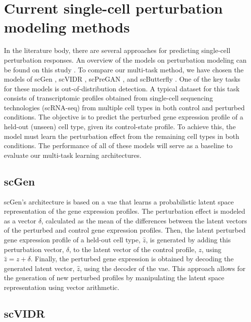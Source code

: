 \documentclass[12pt, a4paper]{article}
\begin{document}
\section{Current single-cell perturbation modeling methods}

In the literature body, there are several approaches for predicting single-cell perturbation responses. An overview of the models on perturbation modeling can be found on this study \cite{gavriilidisMinireviewPerturbationModelling2024}. To compare our multi-task method, we have chosen the models of scGen \cite{lotfollahiScGenPredictsSinglecell2019}, scVIDR \cite{kanaGenerativeModelingSinglecell2023}, scPreGAN \cite{weiScPreGANDeepGenerative2022}, and scButterfly \cite{caoScButterflyVersatileSinglecell2024}.
One of the key tasks for these models is out-of-distribution detection. A typical dataset for this task consists of transcriptomic profiles obtained from single-cell sequencing technologies (scRNA-seq) from multiple cell types in both control and perturbed conditions. The objective is to predict the perturbed gene expression profile of a held-out (unseen) cell type, given its control-state profile. To achieve this, the model must learn the perturbation effect from the remaining cell types in both conditions. The performance of all of these models will serve as a baseline to evaluate our multi-task learning architectures.

\subsection{scGen}

scGen's architecture is based on a \gls{vae} that learns a probabilistic latent space representation of the gene expression profiles. 
The perturbation effect is modeled as a vector $\delta$, calculated as the mean of the differences between the latent vectors of the perturbed and control gene expression profiles. Then, the latent perturbed gene expression profile of a held-out cell type, $\hat{z}$,  is generated by adding this perturbation vector, $\delta$, to the latent vector of the control profile, $z$, using $\hat{z} = z + \delta$. Finally, the perturbed gene expression is obtained by decoding the generated latent vector, $\hat{z}$, using the decoder of the \gls{vae}. This approach allows for the generation of new perturbed profiles by manipulating the latent space representation using vector arithmetic.

\subsection{scVIDR}
 
\end{document}
